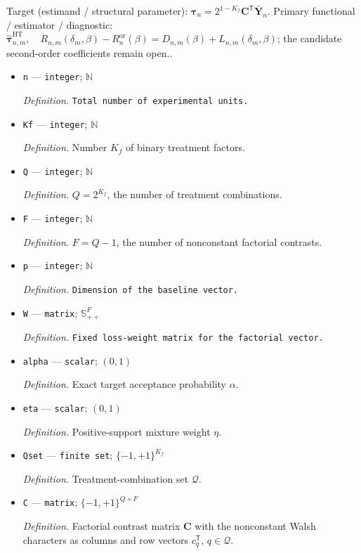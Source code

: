 \documentclass{article}
\begin{document}
Target (estimand / structural parameter): \(\boldsymbol\tau_n=2^{1-K_f}\mathbf C^{\mathsf T}\bar{\mathbf Y}_n\).
Primary functional / estimator / diagnostic: \(\widehat{\boldsymbol\tau}_{n,m}^{\mathrm{HT}},\quad R_{n,m}(\delta_m,\beta)-R_n^{\mathrm{or}}(\beta)=D_{n,m}(\beta)+L_{n,m}(\delta_m,\beta)\); the candidate second-order coefficients remain open..
\begin{itemize}
  \item \texttt{n} --- \texttt{integer}; \(\mathbb N\)
  \par\smallskip\noindent\emph{Definition.} \texttt{Total number of experimental units.}
  \item \texttt{Kf} --- \texttt{integer}; \(\mathbb N\)
  \par\smallskip\noindent\emph{Definition.} Number \(K_f\) of binary treatment factors.
  \item \texttt{Q} --- \texttt{integer}; \(\mathbb N\)
  \par\smallskip\noindent\emph{Definition.} \(Q=2^{K_f}\), the number of treatment combinations.
  \item \texttt{F} --- \texttt{integer}; \(\mathbb N\)
  \par\smallskip\noindent\emph{Definition.} \(F=Q-1\), the number of nonconstant factorial contrasts.
  \item \texttt{p} --- \texttt{integer}; \(\mathbb N\)
  \par\smallskip\noindent\emph{Definition.} \texttt{Dimension of the baseline vector.}
  \item \texttt{W} --- \texttt{matrix}; \(\mathbb S_{++}^{F}\)
  \par\smallskip\noindent\emph{Definition.} \texttt{Fixed loss-\allowbreak{}weight matrix for the factorial vector.}
  \item \texttt{alpha} --- \texttt{scalar}; \((0,1)\)
  \par\smallskip\noindent\emph{Definition.} Exact target acceptance probability \(\alpha\).
  \item \texttt{eta} --- \texttt{scalar}; \((0,1)\)
  \par\smallskip\noindent\emph{Definition.} Positive-support mixture weight \(\eta\).
  \item \texttt{Qset} --- \texttt{finite set}; \(\{-1,+1\}^{K_f}\)
  \par\smallskip\noindent\emph{Definition.} Treatment-combination set \(\mathcal Q\).
  \item \texttt{C} --- \texttt{matrix}; \(\{-1,+1\}^{Q\times F}\)
  \par\smallskip\noindent\emph{Definition.} Factorial contrast matrix \(\mathbf C\) with the nonconstant Walsh characters as columns and row vectors \(c_q^{\mathsf T}\), \(q\in\mathcal Q\).

\end{itemize}
\end{document}
